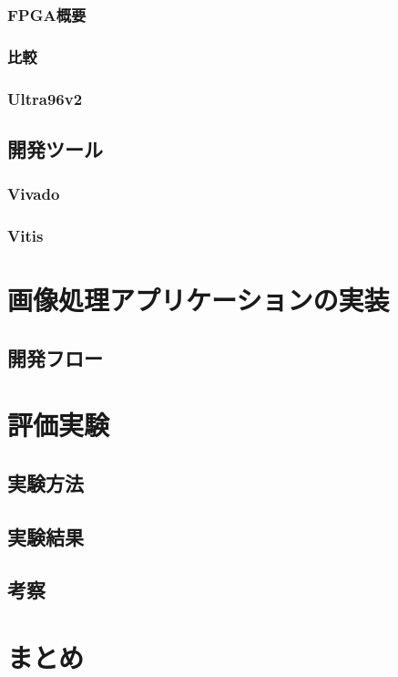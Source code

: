 \documentclass[11pt,a4j]{jreport}
\begin{document}
\subsection{FPGA概要}
\subsection{比較}
\subsection{Ultra96v2}

\section{開発ツール}
\subsection{Vivado}
\subsection{Vitis}

\chapter{画像処理アプリケーションの実装}
\section{開発フロー}
\chapter{評価実験}
\section{実験方法}
\section{実験結果}
\section{考察}

\chapter{まとめ}

\end{document}
